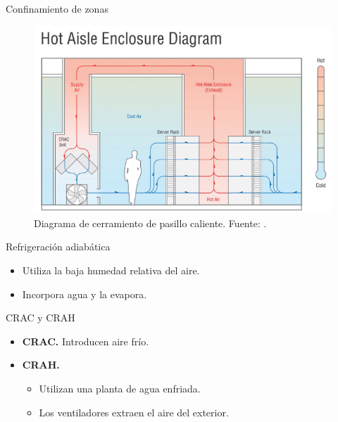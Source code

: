 \documentclass[aspectratio=169, compress]{beamer}
\begin{document}
\begin{frame}{Confinamiento de zonas}
    \begin{figure}
        \begin{center}
            \includegraphics[scale=0.6]{../figures/hot_aisle}
            \caption{Diagrama de cerramiento de pasillo caliente. Fuente: \cite{journal-uptimeinstitute}.}
            \label{hot_aisle}
        \end{center}
    \end{figure}
\end{frame}

\begin{frame}{Refrigeración adiabática}
    \begin{itemize}
        \item Utiliza la baja humedad relativa del aire.
        \item Incorpora agua y la evapora.
    \end{itemize}
\end{frame}

\begin{frame}{CRAC y CRAH}
    \begin{itemize}
        \item \textbf{CRAC.} Introducen aire frío.
        \item \textbf{CRAH.} 
            \begin{itemize}
                \item Utilizan una planta de agua enfriada.
                \item Los ventiladores extraen el aire del exterior.
            \end{itemize}
    \end{itemize}
\end{frame}
\end{document}
